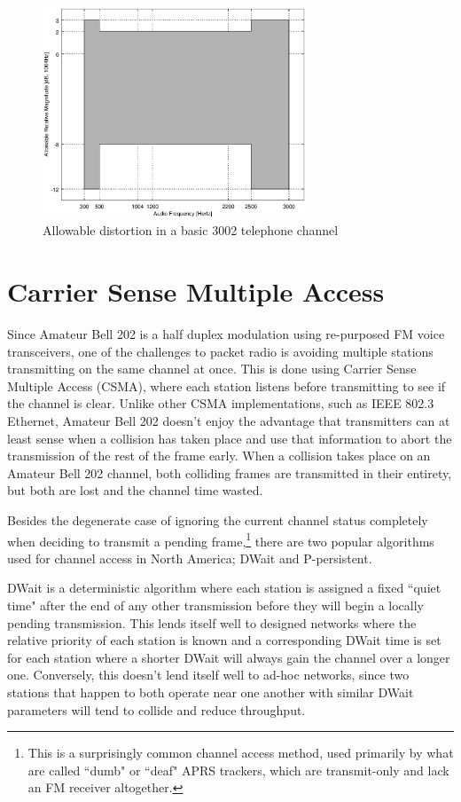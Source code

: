 \begin{figure}
	\centering
	\includegraphics[width=0.7\textwidth]{src/octave/3002}
	\caption{Allowable distortion in a basic 3002 telephone channel}
	\label{fig:3002}
\end{figure}


\section{Carrier Sense Multiple Access}
\label{sec:bell202csma}

Since Amateur Bell 202 is a half duplex modulation using re-purposed 
FM voice transceivers, 
one of the challenges to packet radio is avoiding multiple stations
transmitting on the same channel at once. 
This is done using Carrier Sense Multiple Access (CSMA),
where each station listens before transmitting to see if the channel is clear.
Unlike other CSMA implementations,
such as IEEE 802.3 Ethernet, 
Amateur Bell 202 doesn't enjoy the advantage that transmitters can
at least sense when a collision has taken place 
and use that information to abort the transmission of the rest of the frame early.
When a collision takes place on an Amateur Bell 202 channel, 
both colliding frames are transmitted in their entirety, but both are lost
and the channel time wasted.

Besides the degenerate case of ignoring the current channel status completely when 
deciding to transmit a pending frame,\footnote{This is a surprisingly
	common channel access method, used primarily by what are called ``dumb" or
	``deaf" APRS trackers, which are transmit-only and lack an
FM receiver altogether.}
there are two popular algorithms used for
channel access in North America;
DWait and P-persistent.

DWait is a deterministic algorithm where each station is assigned a fixed
``quiet time" after the end of any other transmission 
before they will begin a locally pending transmission. 
This lends itself well to designed networks
where the relative priority of each station is known and a corresponding DWait time
is set for each station where a shorter DWait will 
always gain the channel over a longer one. 
Conversely, this doesn't lend itself well to ad-hoc networks,
since two stations that happen to both operate near one another 
with similar DWait parameters
will tend to collide and reduce throughput.

